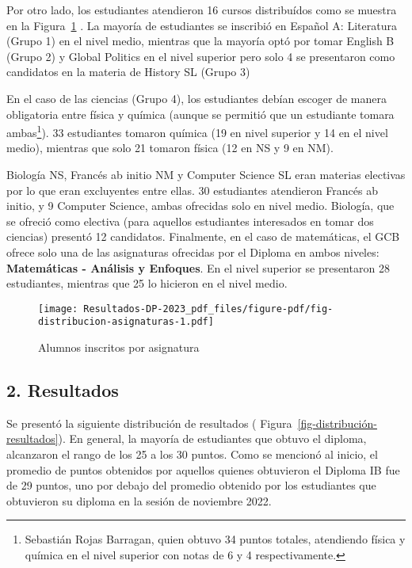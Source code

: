\documentclass[
  letterpaper,
  DIV=11,
  numbers=noendperiod]{scrartcl}
\begin{document}
Por otro lado, los estudiantes atendieron 16 cursos distribuídos como se
muestra en la Figura~\ref{fig-distribucion-asignaturas} . La mayoría de
estudiantes se inscribió en Español A: Literatura (Grupo 1) en el nivel
medio, mientras que la mayoría optó por tomar English B (Grupo 2) y
Global Politics en el nivel superior pero solo 4 se presentaron como
candidatos en la materia de History SL (Grupo 3)

En el caso de las ciencias (Grupo 4), los estudiantes debían escoger de
manera obligatoria entre física y química (aunque se permitió que un
estudiante tomara ambas\footnote{Sebastián Rojas Barragan, quien obtuvo
  34 puntos totales, atendiendo física y química en el nivel superior
  con notas de 6 y 4 respectivamente.}). 33 estudiantes tomaron química
(19 en nivel superior y 14 en el nivel medio), mientras que solo 21
tomaron física (12 en NS y 9 en NM).

Biología NS, Francés ab initio NM y Computer Science SL eran materias
electivas por lo que eran excluyentes entre ellas. 30 estudiantes
atendieron Francés ab initio, y 9 Computer Science, ambas ofrecidas solo
en nivel medio. Biología, que se ofreció como electiva (para aquellos
estudiantes interesados en tomar dos ciencias) presentó 12 candidatos.
Finalmente, en el caso de matemáticas, el GCB ofrece solo una de las
asignaturas ofrecidas por el Diploma en ambos niveles:
\textbf{Matemáticas - Análisis y Enfoques}. En el nivel superior se
presentaron 28 estudiantes, mientras que 25 lo hicieron en el nivel
medio.

\begin{figure}

{\centering \texttt{[image: Resultados-DP-2023\_pdf\_files/figure-pdf/fig-distribucion-asignaturas-1.pdf]}

}

\caption{\label{fig-distribucion-asignaturas}Alumnos inscritos por
asignatura}

\end{figure}

\hypertarget{resultados}{%
\subsection{2. Resultados}\label{resultados}}

Se presentó la siguiente distribución de resultados (
Figura~\ref{fig-distribución-resultados}). En general, la mayoría de
estudiantes que obtuvo el diploma, alcanzaron el rango de los 25 a los
30 puntos. Como se mencionó al inicio, el promedio de puntos obtenidos
por aquellos quienes obtuvieron el Diploma IB fue de 29 puntos, uno por
debajo del promedio obtenido por los estudiantes que obtuvieron su
diploma en la sesión de noviembre 2022.
\end{document}
